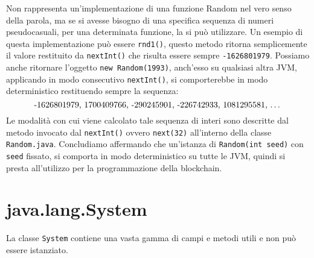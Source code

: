 		Non rappresenta un'implementazione di una funzione Random nel vero senso della parola, ma se si avesse bisogno di una specifica sequenza di numeri pseudocasuali, per una determinata funzione, la si può utilizzare. Un esempio di questa implementazione può essere \lstinline|rnd1()|, questo metodo ritorna semplicemente il valore restituito da \lstinline|nextInt()| che risulta essere sempre \lstinline|-1626801979|. Possiamo anche ritornare l'oggetto \lstinline|new Random(1993)|, anch'esso su qualsiasi altra JVM, applicando in modo consecutivo \lstinline|nextInt()|, si comporterebbe in modo deterministico restituendo sempre la sequenza:
		\[ \text{-1626801979, 1700409766, -290245901, -226742933, 1081295581, \dots}\]
		Le modalità con cui viene calcolato tale sequenza di interi sono descritte dal metodo invocato dal \lstinline|nextInt()| ovvero \lstinline|next(32)| all'interno della classe \lstinline|Random.java|.
		Concludiamo affermando che un'istanza di \lstinline|Random(int seed)| con \lstinline|seed| fissato, si comporta in modo deterministico su tutte le JVM, quindi si presta all'utilizzo per la programmazione della blockchain.
		
	\section{java.lang.System}
		La classe \lstinline|System| contiene una vasta gamma di campi e metodi utili e non può essere istanziato.
		
